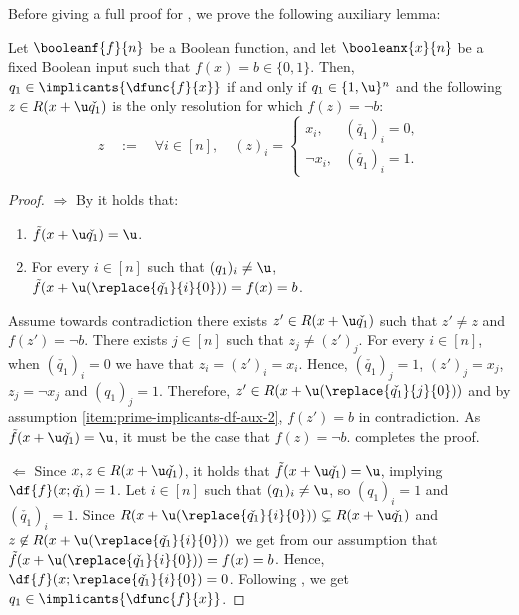 \documentclass[acmsmall, nonacm, authorversion]{acmart}
\begin{document}
Before giving a full proof for , we prove the following auxiliary lemma:

\begin{lemma}\label{lem:prime-implicants-df-aux}
Let $\booleanf{f}{n}$ be a Boolean function, and let $\booleanx{x}{n}$ be a fixed Boolean input such that $f(x)=b\in\{0,1\}$. Then, $q_1\in \implicants{\dfunc{f}{x}}$ if and only if $q_1\in \{1,\u\}^n$ and the following $z\in  R(x+\u\check{q_1})$ is the only resolution for which $f(z)=\neg b$:
\[
    z\quad :=\quad \forall i\in [n], \quad (z)_{i}=\begin{cases}
        x_{i}, & (\check{q_1})_{i} = 0, \\
        \neg x_{i}, & (\check{q_1})_{i} = 1.
    \end{cases}
\]
\end{lemma}
\begin{proof}
$\Rightarrow$ By  it holds that: 
\begin{enumerate}
    \item $\tilde{f}(x+\u\check{q_1})=\u$. \label{item:prime-implicants-df-aux-1}
    \item For every $i\in [n]$ such that $(q_1)_i\neq \u$, $\tilde{f}(x+\u(\replace{\check{q_1}}{i}{0}))=f(x)=b$. \label{item:prime-implicants-df-aux-2}
\end{enumerate}
Assume towards contradiction there exists $z'\in R(x+\u\check{q_1})$ such that $z'\neq z$ and $f(z')=\neg b$. There exists $j\in [n]$ such that $z_j\neq (z')_j$. For every $i\in [n]$, when $(\check{q_1})_i=0$ we have that $z_i=(z')_{i}=x_i$. Hence, $(\check{q_1})_j=1$, $(z')_{j}=x_{j}$, $z_j=\neg x_j$ and $(q_1)_j=1$. Therefore, $z'\in R(x+\u(\replace{\check{q_1}}{j}{0}))$ and by assumption \ref{item:prime-implicants-df-aux-2}, $f(z')=b$ in contradiction. As $\tilde{f}(x+\u\check{q_1})=\u$, it must be the case that  $f(z)=\neg b$.  completes the proof. 

$\Leftarrow$ Since $x,z\in R(x+\u\check{q_1})$, it holds that $\tilde{f}(x+\u\check{q_1})=\u$, implying $\df{f}(x;\check{q_1})=1$. Let $i\in [n]$ such that $(q_1)_i\neq \u$, so $(q_1)_i=1$ and $(\check{q_1})_i=1$. Since $R(x+\u(\replace{\check{q_1}}{i}{0}))\subsetneq R(x+\u\check{q_1})$ and $z\not\in R(x+\u(\replace{\check{q_1}}{i}{0}))$ we get from our assumption that $\tilde{f}(x+\u(\replace{\check{q_1}}{i}{0}))=f(x)=b$. Hence, $\df{f}(x;\replace{\check{q_1}}{i}{0})=0$. Following , we get $q_1\in \implicants{\dfunc{f}{x}}$.
\end{proof}
\end{document}
